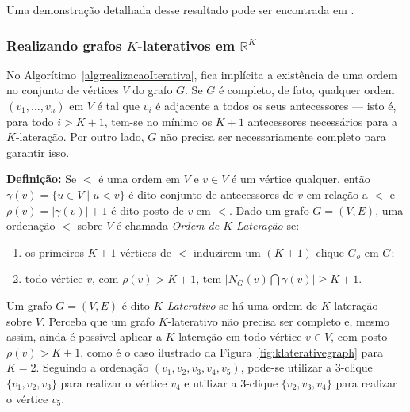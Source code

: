 Uma demonstração detalhada desse resultado pode ser encontrada em \cite{correiaCondicoesNecessaESuficiDGPCayleyMenger}.


\subsubsection{Realizando grafos $K$-laterativos em $\mathbb{R}^K$ \label{sec:oi}}

No Algorítimo~\ref{alg:realizacaoIterativa}, fica implícita a existência de uma ordem no conjunto de vértices $V$ do grafo $G$. Se $G$ é completo, de fato, qualquer ordem $(v_1,\dots,v_n)$ em $V$ é tal que $v_i$ é adjacente a todos os seus antecessores --- isto é, para todo $i>K+1$, tem-se no mínimo os $K+1$ antecessores  necessários para a $K$-lateração. Por outro lado, $G$ não precisa ser necessariamente completo para garantir isso.

\begin{center}
	\begin{minipage}{0.93 \linewidth}
		\textbf{Definição:} Se $<$ é uma ordem em $V$ e $v\in V$ é um vértice qualquer, então $\gamma(v) = \{u\in V \;|\; u<v \}$ é dito conjunto de antecessores de $v$ em relação a $<$ e $\rho(v) = |\gamma(v)|+1$ é dito posto de $v$ em $<$. Dado um grafo $G=(V,E)$, uma ordenação $<$ sobre $V$ é chamada \textit{Ordem de $K$-Lateração} se:
		\begin{enumerate}
			\vspace{-0.2cm}
			\item os primeiros $K+1$ vértices de $<$ induzirem um $(K+1)$-clique $G_o$ em $G$;
			\vspace{-0.2cm}
			\item todo vértice $v$, com $\rho(v) > K+1$, tem $\lvert N_G(v) \bigcap \gamma(v)\rvert \geq K+1$.
		\end{enumerate}
	\end{minipage}
\end{center}

Um grafo $G = (V,E)$ é dito \textit{$K$-Laterativo} se há uma ordem de $K$-lateração sobre $V$. Perceba que um grafo $K$-laterativo não precisa ser completo e, mesmo assim, ainda é possível aplicar a $K$-lateração em todo vértice $v \in V$, com posto $\rho(v) >K+1$, como é o caso ilustrado da Figura~\ref{fig:klaterativegraph} para $K = 2$. Seguindo a ordenação $(v_1, v_2, v_3, v_4, v_5)$, pode-se utilizar a $3$-clique $\{v_1,v_2,v_3\}$ para realizar o vértice $v_4$ e utilizar a $3$-clique $\{v_2,v_3,v_4\}$ para realizar o vértice $v_5$.

